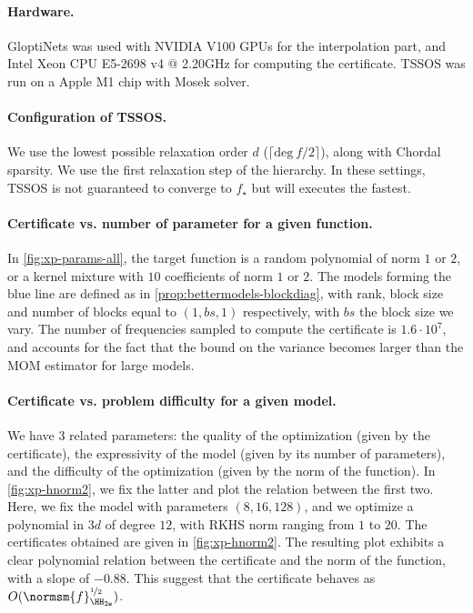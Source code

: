 \documentclass{article}
\begin{document}
\paragraph{Hardware.}
GloptiNets was used with NVIDIA V100 GPUs for the interpolation part, and Intel Xeon CPU E5-2698 v4 @ 2.20GHz for computing the certificate. TSSOS was run on a Apple M1 chip with Mosek solver.

\paragraph{Configuration of TSSOS.}
We use the lowest possible relaxation order $d$ (\ie $\lceil \mathrm{deg} ~ f / 2 \rceil$), along with Chordal sparsity. We use the first relaxation step of the hierarchy. In these settings, TSSOS is not guaranteed to converge to $f_\star$ but will executes the fastest.

\paragraph{Certificate vs. number of parameter for a given function.}
In \cref{fig:xp-params-all}, the target function is a random polynomial of norm $1$ or $2$, or a kernel mixture with $10$ coefficients of norm $1$ or $2$. The models forming the blue line are defined as in \cref{prop:bettermodels-blockdiag}, with rank, block size and number of blocks equal to $(1, bs, 1)$ respectively, with $bs$ the block size we vary. The number of frequencies sampled to compute the certificate is $1.6 \cdot 10^7$, and accounts for the fact that the bound on the variance becomes larger than the MOM estimator for large models.

\paragraph{Certificate vs. problem difficulty for a given model.}
We have 3 related parameters: the quality of the optimization (given by the certificate), the expressivity of the model (given by its number of parameters), and the difficulty of the optimization (given by the norm of the function). In \cref{fig:xp-hnorm2}, we fix the latter and plot the relation between the first two. Here, we fix the model with parameters $(8, 16, 128)$, and we optimize a polynomial in $3d$ of degree $12$, with RKHS norm ranging from $1$ to $20$. The certificates obtained are given in \cref{fig:xp-hnorm2}. The resulting plot exhibits a clear polynomial relation between the certificate and the norm of the function, with a slope of $-0.88$. This suggest that the certificate behaves as $O(\normsm{f}_{\HH_{2 \mathbf{s}}}^{\nicefrac12})$.
\end{document}
